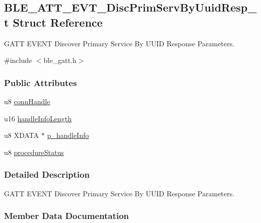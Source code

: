 \hypertarget{struct_b_l_e___a_t_t___e_v_t___disc_prim_serv_by_uuid_resp__t}{}\subsection{B\+L\+E\+\_\+\+A\+T\+T\+\_\+\+E\+V\+T\+\_\+\+Disc\+Prim\+Serv\+By\+Uuid\+Resp\+\_\+t Struct Reference}
\label{struct_b_l_e___a_t_t___e_v_t___disc_prim_serv_by_uuid_resp__t}


G\+A\+TT E\+V\+E\+NT Discover Primary Service By U\+U\+ID Response Parameters.  




{\ttfamily \#include $<$ble\+\_\+gatt.\+h$>$}

\subsubsection*{Public Attributes}
\begin{DoxyCompactItemize}
\item 
u8 \hyperlink{struct_b_l_e___a_t_t___e_v_t___disc_prim_serv_by_uuid_resp__t_af645a5648ff3a1ef3370b105b40c40d0}{conn\+Handle}
\item 
u16 \hyperlink{struct_b_l_e___a_t_t___e_v_t___disc_prim_serv_by_uuid_resp__t_a16472ab59feb8af25ae31df4c9c166d6}{handle\+Info\+Length}
\item 
u8 X\+D\+A\+TA $\ast$ \hyperlink{struct_b_l_e___a_t_t___e_v_t___disc_prim_serv_by_uuid_resp__t_a5ef190334f77a2ce05c1fad2442feadb}{p\+\_\+handle\+Info}
\item 
u8 \hyperlink{struct_b_l_e___a_t_t___e_v_t___disc_prim_serv_by_uuid_resp__t_add498d4f207cafa6cc2da115df0f4988}{procedure\+Status}
\end{DoxyCompactItemize}


\subsubsection{Detailed Description}
G\+A\+TT E\+V\+E\+NT Discover Primary Service By U\+U\+ID Response Parameters. 

\subsubsection{Member Data Documentation}
